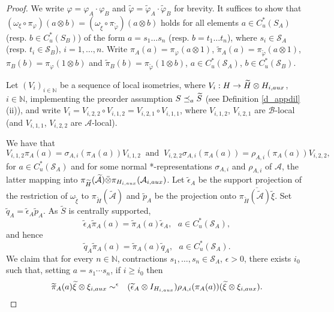\documentclass[10pt,a4paper]{amsart}
\newcommand\nph{\varphi}
\newcommand{\N}{\mathbb{N}}
\newcommand{\bb}[1]{\mathbb{#1}}
\newcommand{\cl}[1]{\mathcal{#1}}
\providecommand{\wt}[1]{\widetilde{#1}}
\begin{document}
\begin{proof}
We write $\nph = \nph_A\cdot\nph_B$ and 
$\wt{\nph} = \wt{\nph}_A\cdot \wt{\nph}_B$ for brevity. 
It suffices to show that  $(\omega_\xi\circ\pi_{\varphi})(a\otimes b) = (\omega_{\wt{\xi}}\circ\pi_{\wt{\varphi}})(a\otimes b)$ holds for all 
elements $a\in C_u^*(S_A)$ (resp. $b\in C_u^*(S_B)$) of the form 
$a = s_1\ldots s_n$ (resp. $b = t_1\ldots t_n$), where $s_i\in \cl S_A$
(resp. $t_i\in\cl S_B$), $i = 1,\dots,n$. 
Write $\pi_A(a) = \pi_\varphi(a\otimes 1)$, $\wt\pi_A(a) = \pi_{\wt\varphi}(a\otimes 1)$, 
$\pi_B(b) = \pi_\varphi(1\otimes b)$ and $\wt\pi_B(b) = \pi_{\wt\varphi}(1\otimes b)$, $a\in C_u^*(\cl S_A)$, $b\in C_u^*(\cl S_B)$. 

Let $(V_i)_{i\in \bb{N}}$ be a sequence of local isometries, 
where $V_i : H\to \wt{H}\otimes H_{i,\rm aux}$, $i\in \bb{N}$,
implementing the preorder assumption $S\preceq_{\rm a} \wt{S}$
(see Definition \ref{d_appdil} (ii)), and write
$V_i = V_{i,2,2}\circ V_{i,1,2} = V_{i,2,1}\circ V_{i,1,1}$, where 
$V_{i,1,2}$, $V_{i,2,1}$ are $\cl{B}$-local (and $V_{i,1,1}$, $V_{i,2,2}$  are $\cl{A}$-local).

We have that 
\begin{equation}\label{eq_Vi22}
V_{i,1,2}\pi_A(a) =\sigma_{A,i}(\pi_A(a))V_{i,1,2}\ \mbox{ and } \ 
V_{i,2,2}\sigma_{A,i}(\pi_A(a))= \rho_{A,i}(\pi_A(a))V_{i,2,2},
\end{equation}
for $a\in C_u^*(\cl S_A)$ and 
for some normal *-representations $\sigma_{A,i}$ and $\rho_{A,i}$ of $\cl A$, the latter mapping into $\pi_{\wt{H}}(\wt{\cl A})\bar\otimes\pi_{H_{i,\rm aux}}(\cl A_{i,\rm aux})$.
Let $\wt{\epsilon}_{A}$ be the support projection of 
the restriction of $\omega_{\wt{\xi}}$ to $\pi_{\wt{H}}({\wt{\cl A}})$
and $\wt{p}_A$ be the projection onto $\overline{\pi_{\wt{H}}(\wt{\cl A})\wt{\xi}}$. 
Set $\wt{q}_A = \wt{\epsilon}_A\wt{p}_A$. As $\wt{S}$ is centrally supported, 
\begin{equation}\label{eq_cen!}
\wt{\epsilon}_A\wt{\pi}_A(a) = \wt{\pi}_A(a)\wt{\epsilon}_A, 
\ \ \ a\in C_u^*(\cl S_A), 
\end{equation}
and hence 
\begin{equation}\label{eq_wtq}
\wt{q}_A\wt{\pi}_A(a) = \wt{\pi}_A(a)\wt{q}_A, \ \ \ a\in C_u^*(\cl S_A).
\end{equation}
We claim that for every $n\in\N$, contractions $s_1,\dots,s_n\in\cl S_A$, $\epsilon>0$, there exists $i_{0}$ such that, 
setting $a=s_1\cdots s_n$, if $i\geq i_{0}$ then
\begin{eqnarray}\label{eq_aimind}
\wt{\pi}_A(a)\wt{\xi}\otimes\xi_{i,{\rm aux}}
& \sim^{\epsilon} & (\wt{\epsilon}_A
\otimes I_{H_{i,{\rm aux}}})\rho_{A,i}(\pi_A(a))(\wt{\xi}\otimes
\xi_{i,{\rm aux}}).
\end{eqnarray}


\end{proof}
\end{document}
